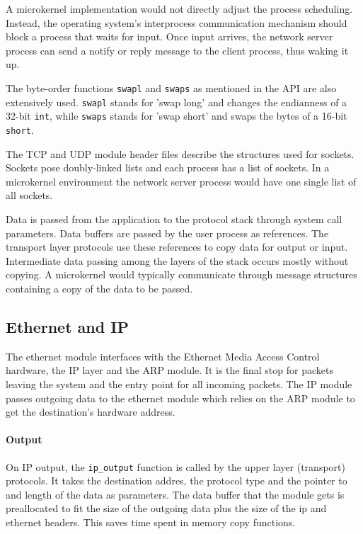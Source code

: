 \documentclass[11pt,twoside,abstract,notitlepage]{scrreprt}
\begin{document}
A microkernel implementation would not directly adjust the process scheduling. Instead, the operating system's interprocess communication mechanism should block a process that waits for input. Once input arrives, the network server process can send a notify or reply message to the client process, thus waking it up. 

The byte-order functions \texttt{swapl} and \texttt{swaps} as mentioned in the API are also extensively used. \texttt{swapl} stands for 'swap long' and changes the endianness of a 32-bit \texttt{int}, while \texttt{swaps} stands for 'swap short' and swaps the bytes of a 16-bit \texttt{short}. 

The TCP and UDP module header files describe the structures used for sockets. Sockets pose doubly-linked lists and each process has a list of sockets. In a microkernel environment the network server process would have one single list of all sockets. 

Data is passed from the application to the protocol stack through system call parameters. Data buffers are passed by the user process as references. The transport layer protocols use these references to copy data for output or input. Intermediate data passing among the layers of the stack occurs mostly without copying. A microkernel would typically communicate through message structures containing a copy of the data to be passed. 

\subsection{Ethernet and IP}
The ethernet module interfaces with the Ethernet Media Access Control hardware, the IP layer and the ARP module. It is the final stop for packets leaving the system and the entry point for all incoming packets. The IP module passes outgoing data to the ethernet module which relies on the ARP module to get the destination's hardware address.

\paragraph{Output}
On IP output, the \texttt{ip\_output} function is called by the upper layer (transport) protocols. It takes the destination addres, the protocol type and the pointer to and length of the data as parameters. The data buffer that the module gets is preallocated to fit the size of the outgoing data plus the size of the ip and ethernet headers. This saves time spent in memory copy functions.
 
\end{document}

